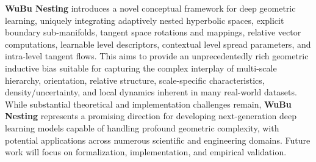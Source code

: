 \documentclass[11pt, twoside]{article} %
\newcommand{\wubu}{\textbf{WuBu Nesting}} %
\begin{document}
\wubu{} introduces a novel conceptual framework for deep geometric learning, uniquely integrating adaptively nested hyperbolic spaces, explicit boundary sub-manifolds, tangent space rotations and mappings, relative vector computations, learnable level descriptors, contextual level spread parameters, and intra-level tangent flows. This aims to provide an unprecedentedly rich geometric inductive bias suitable for capturing the complex interplay of multi-scale hierarchy, orientation, relative structure, scale-specific characteristics, density/uncertainty, and local dynamics inherent in many real-world datasets. While substantial theoretical and implementation challenges remain, \wubu{} represents a promising direction for developing next-generation deep learning models capable of handling profound geometric complexity, with potential applications across numerous scientific and engineering domains. Future work will focus on formalization, implementation, and empirical validation.


\end{document}
